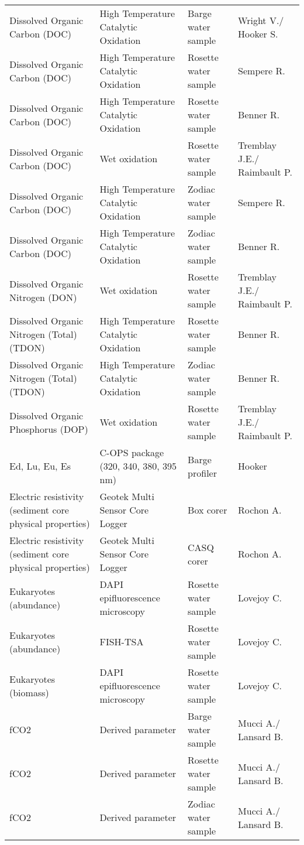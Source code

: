 \begin{landscape}
\begin{longtable}[t]{llll}
\addlinespace
Dissolved Organic Carbon (DOC) & High Temperature Catalytic Oxidation & Barge water sample & Wright V./ Hooker S.\\
Dissolved Organic Carbon (DOC) & High Temperature Catalytic Oxidation & Rosette water sample & Sempere R.\\
Dissolved Organic Carbon (DOC) & High Temperature Catalytic Oxidation & Rosette water sample & Benner R.\\
Dissolved Organic Carbon (DOC) & Wet oxidation & Rosette water sample & Tremblay J.E./ Raimbault P.\\
Dissolved Organic Carbon (DOC) & High Temperature Catalytic Oxidation & Zodiac water sample & Sempere R.\\
\addlinespace
Dissolved Organic Carbon (DOC) & High Temperature Catalytic Oxidation & Zodiac water sample & Benner R.\\
Dissolved Organic Nitrogen (DON) & Wet oxidation & Rosette water sample & Tremblay J.E./ Raimbault P.\\
Dissolved Organic Nitrogen (Total) (TDON) & High Temperature Catalytic Oxidation & Rosette water sample & Benner R.\\
Dissolved Organic Nitrogen (Total) (TDON) & High Temperature Catalytic Oxidation & Zodiac water sample & Benner R.\\
Dissolved Organic Phosphorus (DOP) & Wet oxidation & Rosette water sample & Tremblay J.E./ Raimbault P.\\
\addlinespace
Ed, Lu, Eu, Es & C-OPS package (320, 340, 380, 395 nm) & Barge profiler & Hooker\\
Electric resistivity (sediment core physical properties) & Geotek Multi Sensor Core Logger & Box corer & Rochon A.\\
Electric resistivity (sediment core physical properties) & Geotek Multi Sensor Core Logger & CASQ corer & Rochon A.\\
Eukaryotes (abundance) & DAPI epifluorescence microscopy & Rosette water sample & Lovejoy C.\\
Eukaryotes (abundance) & FISH-TSA & Rosette water sample & Lovejoy C.\\
\addlinespace
Eukaryotes (biomass) & DAPI epifluorescence microscopy & Rosette water sample & Lovejoy C.\\
fCO2 & Derived parameter & Barge water sample & Mucci A./ Lansard B.\\
fCO2 & Derived parameter & Rosette water sample & Mucci A./ Lansard B.\\
fCO2 & Derived parameter & Zodiac water sample & Mucci A./ Lansard B.\\

\end{longtable}
\end{landscape}

